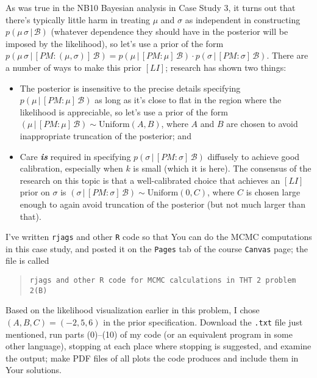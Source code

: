 \documentclass[12pt]{article}
\newcommand{\given}{\, | \,}
\newcommand{\bi}[1]{\b{\i{#1}}}
\renewcommand{\b}[1]{\textbf{#1}}
\renewcommand{\i}[1]{\textit{#1}}
\begin{document}
As was true in the NB10 Bayesian analysis in Case Study 3, it turns out that there's typically little harm in treating $\mu$ and $\sigma$ as independent in constructing $p ( \mu \, \sigma \given \mathcal{ B } )$ (whatever dependence they should have in the posterior will be imposed by the likelihood), so let's use a prior of the form $p ( \mu \, \sigma \given [ PM \! \! : \! ( \mu, \sigma ) ] \, \mathcal{ B } ) = p ( \mu \given [ PM \! \! : \! \mu ] \, \mathcal{ B } ) \cdot p ( \sigma \given [ PM \! \! : \! \sigma ] \, \mathcal{ B } )$. There are a number of ways to make this prior $[ LI ]$; research has shown two things: 

\begin{itemize}

\item

The posterior is insensitive to the precise details specifying $p ( \mu \given [ PM \! \! : \! \mu ] \, \mathcal{ B } ) $ as long as it's close to flat in the region where the likelihood is appreciable, so let's use a prior of the form $( \mu \given [ PM \! \! : \! \!  \mu ] \, \mathcal{ B } ) \sim \textrm{Uniform} ( A, B )$, where $A$ and $B$ are chosen to avoid inappropriate truncation of the posterior; and

\item

Care \bi{is} required in specifying $p ( \sigma \given [ PM \! \! : \! \sigma ] \, \mathcal{ B } )$ diffusely to achieve good calibration, especially when $k$ is small (which it is here). The consensus of the research on this topic is that a well-calibrated choice that achieves an $[ LI ]$ prior on $\sigma$ is $( \sigma \given [ PM \! \! : \! \sigma ] \, \mathcal{ B } ) \sim \textrm{Uniform} ( 0, C )$, where $C$ is chosen large enough to again avoid truncation of the posterior (but not much larger than that). 

\end{itemize}

I've written \texttt{rjags} and other \texttt{R} code so that You can do the MCMC computations in this case study, and posted it on the \texttt{Pages} tab of the course \texttt{Canvas} page; the file is called
\begin{quote}

\texttt{rjags and other R code for MCMC calculations in THT 2 problem 2(B)}

\end{quote}
Based on the likelihood visualization earlier in this problem, I chose $( A, B, C ) = ( -2, 5, 6 )$ in the prior specification. Download the \texttt{.txt} file just mentioned, run parts (0)--(10) of my code (or an equivalent program in some other language), stopping at each place where stopping is suggested, and examine the output; make PDF files of all plots the code produces and include them in Your solutions.
\end{document}

